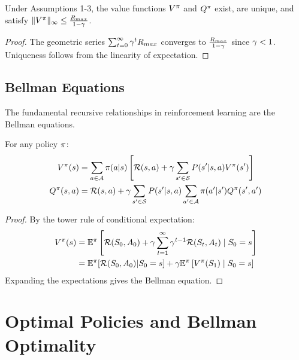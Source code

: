 \begin{theorem}
Under Assumptions 1-3, the value functions $V^\pi$ and $Q^\pi$ exist, are unique, and satisfy $\|V^\pi\|_\infty \leq \frac{R_{max}}{1-\gamma}$.
\end{theorem}

\begin{proof}
The geometric series $\sum_{t=0}^\infty \gamma^t R_{max}$ converges to $\frac{R_{max}}{1-\gamma}$ since $\gamma < 1$. Uniqueness follows from the linearity of expectation.
\end{proof}

\subsection{Bellman Equations}

The fundamental recursive relationships in reinforcement learning are the Bellman equations.

\begin{theorem}
For any policy $\pi$:
\begin{align}
V^\pi(s) &= \sum_{a \in \mathcal{A}} \pi(a|s) \left[\mathcal{R}(s,a) + \gamma \sum_{s' \in \mathcal{S}} P(s'|s,a) V^\pi(s')\right] \\
Q^\pi(s,a) &= \mathcal{R}(s,a) + \gamma \sum_{s' \in \mathcal{S}} P(s'|s,a) \sum_{a' \in \mathcal{A}} \pi(a'|s') Q^\pi(s',a')
\end{align}
\end{theorem}

\begin{proof}
By the tower rule of conditional expectation:
\begin{align}
V^\pi(s) &= \mathbb{E}^\pi\left[\mathcal{R}(S_0, A_0) + \gamma \sum_{t=1}^\infty \gamma^{t-1} \mathcal{R}(S_t, A_t) \mid S_0 = s\right] \\
&= \mathbb{E}^\pi[\mathcal{R}(S_0, A_0) | S_0 = s] + \gamma \mathbb{E}^\pi\left[V^\pi(S_1) \mid S_0 = s\right]
\end{align}
Expanding the expectations gives the Bellman equation.
\end{proof}

\section{Optimal Policies and Bellman Optimality}


